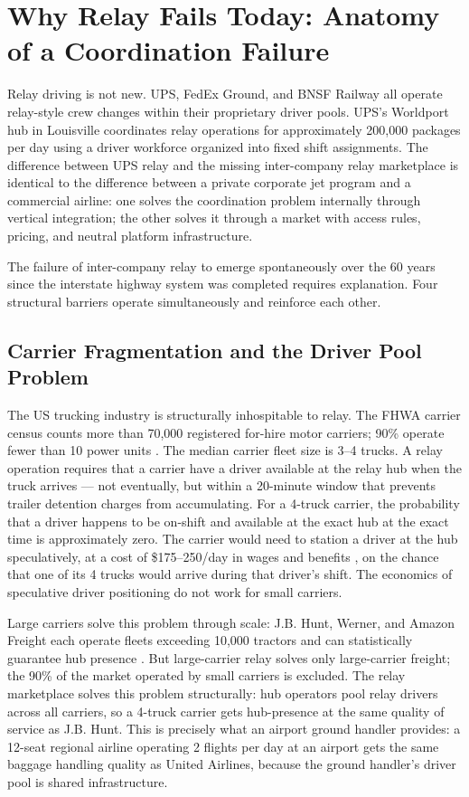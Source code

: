 \section{Why Relay Fails Today: Anatomy of a Coordination Failure}
\label{sec:why-relay-fails}

Relay driving is not new. UPS, FedEx Ground, and BNSF Railway all operate relay-style crew changes within their proprietary driver pools. UPS's Worldport hub in Louisville coordinates relay operations for approximately 200,000 packages per day using a driver workforce organized into fixed shift assignments. The difference between UPS relay and the missing inter-company relay marketplace is identical to the difference between a private corporate jet program and a commercial airline: one solves the coordination problem internally through vertical integration; the other solves it through a market with access rules, pricing, and neutral platform infrastructure.

The failure of inter-company relay to emerge spontaneously over the 60 years since the interstate highway system was completed requires explanation. Four structural barriers operate simultaneously and reinforce each other.

\subsection{Carrier Fragmentation and the Driver Pool Problem}

The US trucking industry is structurally inhospitable to relay. The FHWA carrier census counts more than 70,000 registered for-hire motor carriers; 90\% operate fewer than 10 power units \citep{FHWA_freight2023}. The median carrier fleet size is 3--4 trucks. A relay operation requires that a carrier have a driver available at the relay hub when the truck arrives --- not eventually, but within a 20-minute window that prevents trailer detention charges from accumulating. For a 4-truck carrier, the probability that a driver happens to be on-shift and available at the exact hub at the exact time is approximately zero. The carrier would need to station a driver at the hub speculatively, at a cost of \$175--250/day in wages and benefits \citep{BLS_trucking2023}, on the chance that one of its 4 trucks would arrive during that driver's shift. The economics of speculative driver positioning do not work for small carriers.

Large carriers solve this problem through scale: J.B. Hunt, Werner, and Amazon Freight each operate fleets exceeding 10,000 tractors and can statistically guarantee hub presence \citep{FHWA_freight2023}. But large-carrier relay solves only large-carrier freight; the 90\% of the market operated by small carriers is excluded. The relay marketplace solves this problem structurally: hub operators pool relay drivers across all carriers, so a 4-truck carrier gets hub-presence at the same quality of service as J.B. Hunt. This is precisely what an airport ground handler provides: a 12-seat regional airline operating 2 flights per day at an airport gets the same baggage handling quality as United Airlines, because the ground handler's driver pool is shared infrastructure.

